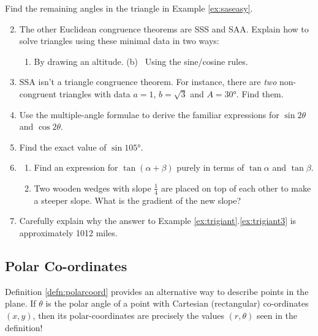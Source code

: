   
\begin{exercises}{}{}
	\exstart Find the remaining angles in the triangle in Example \ref{ex:saseasy}.%
	\begin{enumerate}\setcounter{enumi}{1}
	  \item The other Euclidean congruence theorems are SSS and SAA. Explain how to solve triangles using these minimal data in two ways:
	  \begin{enumerate}
	    \item By drawing an altitude. \qquad\qquad 
	    (b) \ Using the sine/cosine rules.
	  \end{enumerate}
	
	  \item SSA isn't a triangle congruence theorem. For instance, there are \emph{two} non-congruent triangles with data $a=1$, $b=\sqrt 3$ and $A=\ang{30}$. Find them.
	
	  \item Use the multiple-angle formulae to derive the familiar expressions for $\sin 2\theta$ and $\cos 2\theta$.
	  
	  \item Find the exact value of $\sin\ang{105}$.
	  
	  \item\begin{enumerate}
	    \item Find an expression for $\tan(\alpha+\beta)$ purely in terms of $\tan\alpha$ and $\tan\beta$.
	  	 \item Two wooden wedges with slope $\frac 14$ are placed on top of each other to make a steeper slope. What is the gradient of the new slope?
	  \end{enumerate} 
	  
	  \item Carefully explain why the answer to Example \ref*{ex:trigiant}.\ref{ex:trigiant3} is approximately 1012 miles.
	\end{enumerate}
\end{exercises}


\clearpage


\subsection{Polar Co-ordinates}

Definition \ref{defn:polarcoord} provides an alternative way to describe points in the plane. If $\theta$ is the polar angle of a point with Cartesian (rectangular) co-ordinates $(x,y)$, then its polar-coordinates are precisely the values $(r,\theta)$ seen in the definition!\smallbreak

